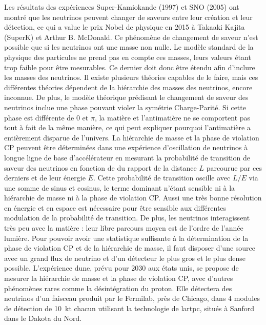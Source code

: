 Les résultats des expériences Super-Kamiokande (1997) et SNO (2005) ont montré que les neutrinos peuvent changer de saveurs entre leur création et leur détection, ce qui a value le prix Nobel de physique en 2015 à Takaaki Kajita (SuperK) et Arthur B. McDonald.  Ce phénomène de changement de saveur n'est possible que si les neutrinos ont une masse non nulle. Le modèle standard de la physique des particules ne prend pas en compte ces masses, leurs valeurs étant trop faible pour être mesurables. Ce dernier doit donc être étendu afin d'inclure les masses des neutrinos. Il existe plusieurs théories capables de le faire, mais ces différentes théories dépendent de la hiérarchie des masses des neutrinos, encore inconnue. De plus, le modèle théorique prédisant le changement de saveur des neutrinos inclue une phase pouvant violer la symétrie Charge-Parité. Si cette phase est différente de 0 et $\pi$, la matière et l'antimatière ne se comportent pas tout à fait de la même manière, ce qui peut expliquer pourquoi l'antimatière a entièrement disparue de l'univers. La hiérarchie de masse et la phase de violation CP peuvent être déterminées dans une expérience d'oscillation de neutrinos à longue ligne de base d'accélérateur en mesurant la probabilité de transition de saveur des neutrinos en fonction de du rapport de la distance $L$ parcourue par ces derniers et de leur énergie $E$. Cette probabilité de transition oscille avec $L/E$ via une somme de sinus et cosinus, le terme dominant n'étant sensible ni à la hiérarchie de masse ni à la phase de violation CP. Aussi une très bonne résolution en énergie et en espace est nécessaire pour être sensible aux différentes modulation de la probabilité de transition. De plus, les neutrinos interagissent très peu avec la matière : leur libre parcours moyen est de l'ordre de l'année lumière. Pour pouvoir avoir une statistique suffisante à la détermination de la phase de violation CP et de la hiérarchie de masse, il faut disposer d'une source avec un grand flux de neutrino et d'un détecteur le plus gros et le plus dense possible. L'expérience \gls{dune}, prévu pour 2030 aux états unis, se propose de mesurer la hiérarchie de masse et la phase de violation CP, avec d'autres phénomènes rares comme la désintégration du proton. Elle détectera des neutrinos d'un faisceau produit par le Fermilab, près de Chicago, dans 4 modules de détection de \SI{10}{\kilo\tonne} chacun utilisant la technologie de \gls{lartpc}, situés à Sanford dans le Dakota du Nord.

